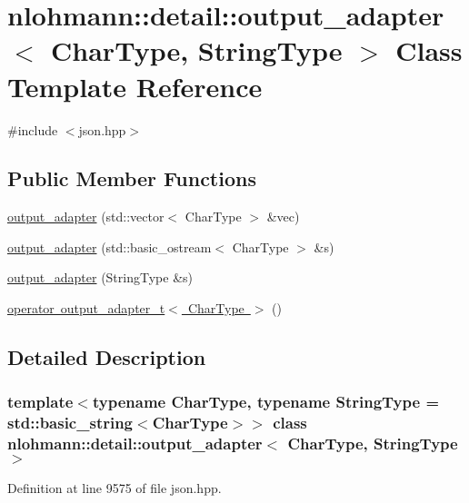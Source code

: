 \hypertarget{classnlohmann_1_1detail_1_1output__adapter}{}\section{nlohmann\+::detail\+::output\+\_\+adapter$<$ Char\+Type, String\+Type $>$ Class Template Reference}
\label{classnlohmann_1_1detail_1_1output__adapter}


{\ttfamily \#include $<$json.\+hpp$>$}

\subsection*{Public Member Functions}
\begin{DoxyCompactItemize}
\item 
\mbox{\hyperlink{classnlohmann_1_1detail_1_1output__adapter_a05a30a77b568fd84676078d938cbd484}{output\+\_\+adapter}} (std\+::vector$<$ Char\+Type $>$ \&vec)
\item 
\mbox{\hyperlink{classnlohmann_1_1detail_1_1output__adapter_a43b3ba852e6a2c3f4d312543bb04c00d}{output\+\_\+adapter}} (std\+::basic\+\_\+ostream$<$ Char\+Type $>$ \&s)
\item 
\mbox{\hyperlink{classnlohmann_1_1detail_1_1output__adapter_a6ad59d1ec534383b430cd7ef8a518539}{output\+\_\+adapter}} (String\+Type \&s)
\item 
\mbox{\hyperlink{classnlohmann_1_1detail_1_1output__adapter_a5fdac7aec8ade2f4bb0b5df30550d90c}{operator output\+\_\+adapter\+\_\+t$<$ Char\+Type $>$}} ()
\end{DoxyCompactItemize}


\subsection{Detailed Description}
\subsubsection*{template$<$typename Char\+Type, typename String\+Type = std\+::basic\+\_\+string$<$\+Char\+Type$>$$>$\newline
class nlohmann\+::detail\+::output\+\_\+adapter$<$ Char\+Type, String\+Type $>$}



Definition at line 9575 of file json.\+hpp.



